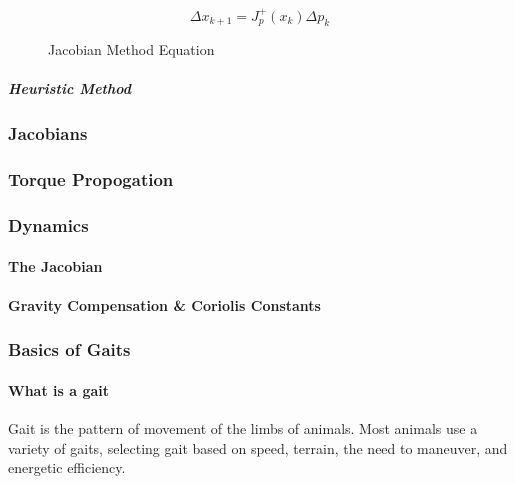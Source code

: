                 \begin{figure}
                    \centering
                    $$\Delta x_{k+1} = J_p^+ (x_k)\Delta p_k 
                    $$
                    \caption{Jacobian Method Equation}
                    \label{fig:ikin_jacobian}
                \end{figure}
            \subparagraph*{Heuristic Method}

        \subsubsection{Jacobians} \label{subsec:jacobians}

        \subsubsection{Torque Propogation}

        \subsubsection{Dynamics}
            \paragraph*{The Jacobian}

            \paragraph*{Gravity Compensation \& Coriolis Constants}

        \subsubsection{Basics of Gaits}
            \paragraph*{What is a gait}
            Gait is the pattern of movement of the limbs of animals. Most animals use a variety of gaits, selecting gait based on speed, terrain, the need to maneuver, and energetic efficiency. \cite{wikipedia_2018_Gaits} 

